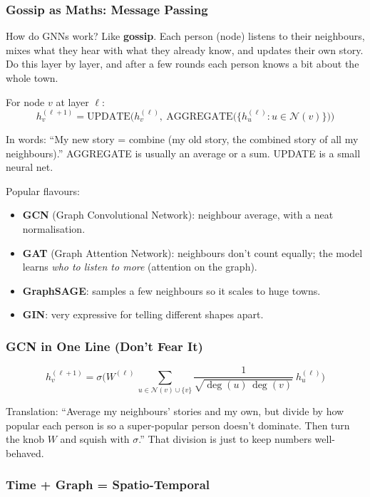 \documentclass[11pt,a4paper]{article}
\begin{document}
\subsubsection{Gossip as Maths: Message Passing}

How do GNNs work? Like \textbf{gossip}. Each person (node) listens to their
neighbours, mixes what they hear with what they already know, and updates their
own story. Do this layer by layer, and after a few rounds each person knows a
bit about the whole town.

For node $v$ at layer $\ell$:
\[
h_v^{(\ell+1)} =
\text{UPDATE}\Big( h_v^{(\ell)},\ \text{AGGREGATE}\big(\{ h_u^{(\ell)} : u \in \mathcal{N}(v) \}\big) \Big)
\]

In words: ``My new story = combine (my old story, the combined story of all
my neighbours).'' AGGREGATE is usually an average or a sum. UPDATE is a small
neural net.

Popular flavours:
\begin{itemize}[leftmargin=1.6em,itemsep=2pt]
  \item \textbf{GCN} (Graph Convolutional Network): neighbour average, with a
        neat normalisation.
  \item \textbf{GAT} (Graph Attention Network): neighbours don't count equally;
        the model learns \emph{who to listen to more} (attention on the graph).
  \item \textbf{GraphSAGE}: samples a few neighbours so it scales to huge towns.
  \item \textbf{GIN}: very expressive for telling different shapes apart.
\end{itemize}

\subsubsection{GCN in One Line (Don't Fear It)}

\[
h_v^{(\ell+1)} = \sigma\!\Bigg( W^{(\ell)}\,
\sum_{u \in \mathcal{N}(v) \cup \{v\}}
\frac{1}{\sqrt{\deg(u)\,\deg(v)}}\ h_u^{(\ell)} \Bigg)
\]

Translation: ``Average my neighbours' stories and my own, but divide by how
popular each person is so a super-popular person doesn't dominate. Then turn
the knob $W$ and squish with $\sigma$.'' That division is just to keep numbers
well-behaved.

\subsubsection{Time + Graph = Spatio-Temporal}
\end{document}

